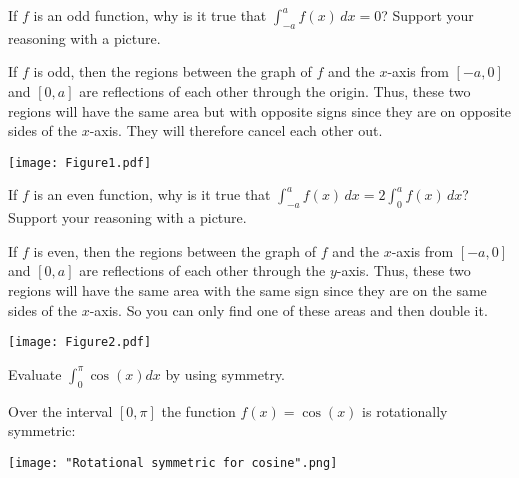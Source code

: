 \documentclass[nooutcomes]{ximera}
\renewcommand{\d}{\,d}
\renewenvironment{freeResponse}{
\ifhandout\setbox0\vbox\bgroup\else
\begin{trivlist}\item[\hskip \labelsep\bfseries Solution:\hspace{2ex}]
\fi}
{\ifhandout\egroup\else
\end{trivlist}
\fi}
\begin{document}
\begin{problem}
  \mbox{}
  \begin{enumerate}
		
  \item[1.]  If $f$ is an odd function, why is it true that
    $\int_{-a}^a f(x) \d x = 0$?  Support your reasoning with a
    picture.
    \begin{freeResponse}
      If $f$ is odd, then the regions between the graph of $f$ and the
      $x$-axis from $[-a,0]$ and $[0,a]$ are reflections of each other
      through the origin.  Thus, these two regions will have the same
      area but with opposite signs since they are on opposite sides of
      the $x$-axis.  They will therefore cancel each other out.
		
      \begin{image}
        \texttt{[image: Figure1.pdf]}
      \end{image}

    \end{freeResponse}
		
		
		
  \item[2.]  If $f$ is an even function, why is it true that
    $\int_{-a}^a f(x) \d x = 2 \int_0^a f(x) \d x$?  Support your
    reasoning with a picture.
    \begin{freeResponse}
      If $f$ is even, then the regions between the graph of $f$ and
      the $x$-axis from $[-a,0]$ and $[0,a]$ are reflections of each
      other through the $y$-axis.  Thus, these two regions will have
      the same area with the same sign since they are on the same
      sides of the $x$-axis.  So you can only find one of these areas
      and then double it.
		
      \begin{image}
        \texttt{[image: Figure2.pdf]}
      \end{image}
			
    \end{freeResponse}
		
		
	
  \item[3.]
    Evaluate $\int_0^{\pi} \cos(x) dx$ by using symmetry.
    \begin{freeResponse}
      Over the interval $[0, \pi]$ the function $f(x) = \cos(x)$ is
      rotationally symmetric:
      \begin{image}
        \texttt{[image: "Rotational symmetric for cosine".png]}
      \end{image}
    \end{freeResponse}
  \end{enumerate}
\end{problem}
\end{document}
